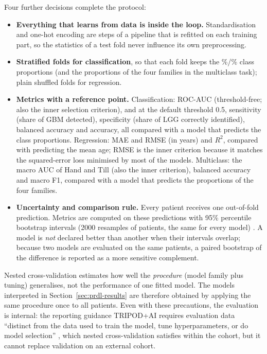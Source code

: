 Four further decisions complete the protocol:
\begin{itemize}
  \item \textbf{Everything that learns from data is inside the loop.} Standardisation and one-hot
        encoding are steps of a pipeline that is refitted on each training part, so the statistics of
        a test fold never influence its own preprocessing.
  \item \textbf{Stratified folds for classification}, so that each fold keeps the
        \PctLGG\%/\PctGBM\% class proportions (and the proportions of the four families in the
        multiclass task); plain shuffled folds for regression.
  \item \textbf{Metrics with a reference point.} Classification: ROC-AUC (threshold-free; also the
        inner selection criterion), and at the default threshold 0.5, sensitivity (share of GBM
        detected), specificity (share of LGG correctly identified), balanced accuracy and accuracy,
        all compared with a model that predicts the class proportions. Regression: MAE and RMSE (in
        years) and $R^2$, compared with predicting the mean age; RMSE is the inner criterion because
        it matches the squared-error loss minimised by most of the models. Multiclass: the macro AUC of
        Hand and Till (also the inner criterion), balanced accuracy and macro F1, compared with a model
        that predicts the proportions of the four families.
  \item \textbf{Uncertainty and comparison rule.} Every patient receives one out-of-fold prediction.
        Metrics are computed on these predictions with 95\% percentile bootstrap intervals (2000
        resamples of patients, the same for every model) \cite{efron1993}. A model is \emph{not}
        declared better than another when their intervals overlap; because two models are evaluated
        on the same patients, a paired bootstrap of the difference is reported as a more sensitive
        complement.
\end{itemize}

Nested cross-validation estimates how well the \emph{procedure} (model family plus tuning)
generalises, not the performance of one fitted model. The models interpreted in
Section~\ref{sec:prdl-results} are therefore obtained by applying the same procedure once to all
patients. Even with these precautions, the evaluation is internal: the reporting guidance TRIPOD+AI
requires evaluation data ``distinct from the data used to train the model, tune hyperparameters, or
do model selection'' \cite{collins2024}, which nested cross-validation satisfies within the cohort,
but it cannot replace validation on an external cohort.
